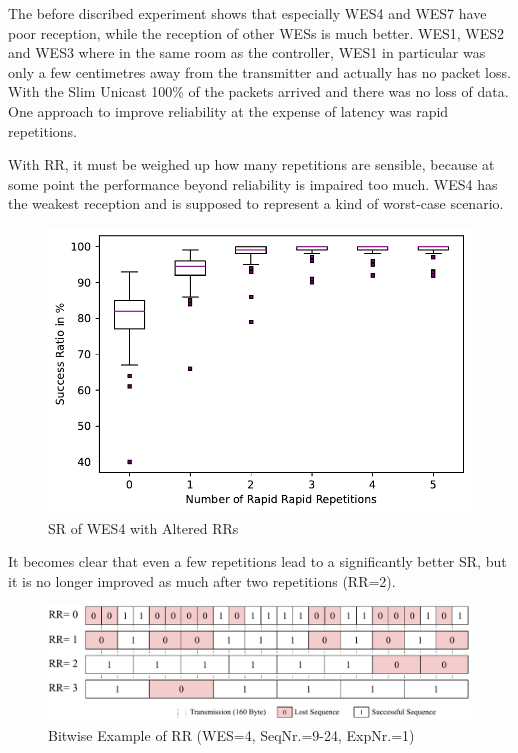 The before discribed experiment shows that especially WES4 and WES7 have poor reception,
while the reception of other WESs is much better.
WES1, WES2 and WES3 where in the same room as the controller, 
WES1 in particular was only a few centimetres away from the transmitter and actually has no packet loss.
With the Slim Unicast 100\% of the packets arrived and there was no loss of data.
One approach to improve reliability at the expense of latency was rapid repetitions.

With RR, it must be weighed up how many repetitions are sensible, 
because at some point the performance beyond reliability is impaired too much.
WES4 has the weakest reception and is supposed to represent a kind of worst-case scenario.

\begin{figure}[h]
	\centering
	\includegraphics[scale=0.6]{../Plot2/Graphs/SR_of_node4_rr.pdf}
	\caption{SR of WES4 with Altered RRs}
	\label{fig:sr_broadcast_wes4}
\end{figure}

It becomes clear that even a few repetitions lead to a significantly better SR,
but it is no longer improved as much after two repetitions (RR=2).

\begin{figure}[h]
	\centering
	\includegraphics[scale=0.5]{figures/rrBitwise.pdf}
	\caption{Bitwise Example of RR (WES=4, SeqNr.=9-24, ExpNr.=1)}
	\label{fig:rrBitwise}
\end{figure}

